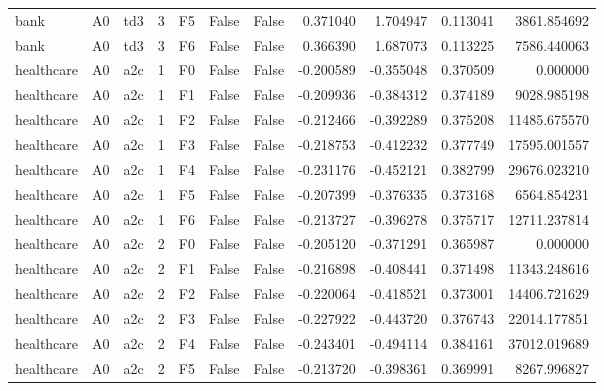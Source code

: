 \begin{tabular}{lllrlllrrrr}
      bank &      A0 &       td3 &     3 &  F5 &           False &            False &  0.371040 &  1.704947 & 0.113041 &      3861.854692 \\
      bank &      A0 &       td3 &     3 &  F6 &           False &            False &  0.366390 &  1.687073 & 0.113225 &      7586.440063 \\
healthcare &      A0 &       a2c &     1 &  F0 &           False &            False & -0.200589 & -0.355048 & 0.370509 &         0.000000 \\
healthcare &      A0 &       a2c &     1 &  F1 &           False &            False & -0.209936 & -0.384312 & 0.374189 &      9028.985198 \\
healthcare &      A0 &       a2c &     1 &  F2 &           False &            False & -0.212466 & -0.392289 & 0.375208 &     11485.675570 \\
healthcare &      A0 &       a2c &     1 &  F3 &           False &            False & -0.218753 & -0.412232 & 0.377749 &     17595.001557 \\
healthcare &      A0 &       a2c &     1 &  F4 &           False &            False & -0.231176 & -0.452121 & 0.382799 &     29676.023210 \\
healthcare &      A0 &       a2c &     1 &  F5 &           False &            False & -0.207399 & -0.376335 & 0.373168 &      6564.854231 \\
healthcare &      A0 &       a2c &     1 &  F6 &           False &            False & -0.213727 & -0.396278 & 0.375717 &     12711.237814 \\
healthcare &      A0 &       a2c &     2 &  F0 &           False &            False & -0.205120 & -0.371291 & 0.365987 &         0.000000 \\
healthcare &      A0 &       a2c &     2 &  F1 &           False &            False & -0.216898 & -0.408441 & 0.371498 &     11343.248616 \\
healthcare &      A0 &       a2c &     2 &  F2 &           False &            False & -0.220064 & -0.418521 & 0.373001 &     14406.721629 \\
healthcare &      A0 &       a2c &     2 &  F3 &           False &            False & -0.227922 & -0.443720 & 0.376743 &     22014.177851 \\
healthcare &      A0 &       a2c &     2 &  F4 &           False &            False & -0.243401 & -0.494114 & 0.384161 &     37012.019689 \\
healthcare &      A0 &       a2c &     2 &  F5 &           False &            False & -0.213720 & -0.398361 & 0.369991 &      8267.996827 \\

\end{tabular}
